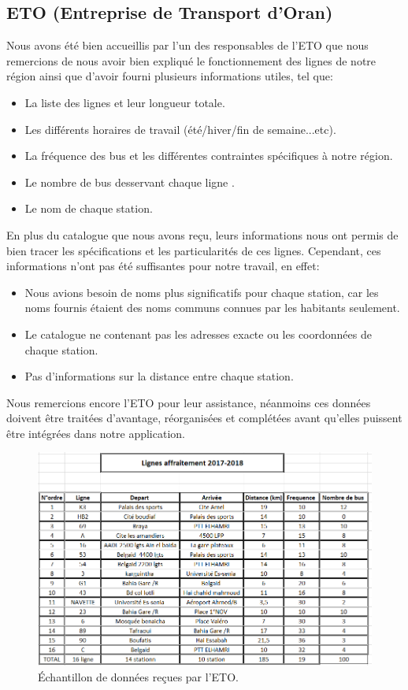 \subsection{ETO (Entreprise de Transport d'Oran)}

Nous avons été bien accueillis par l'un des responsables de l'ETO que nous remercions de nous avoir bien expliqué le fonctionnement des lignes de notre région ainsi que d'avoir fourni plusieurs informations utiles, tel que:
\begin{itemize}
	\item La liste des lignes et leur longueur totale.
	\item Les différents horaires de travail (été/hiver/fin de semaine...etc).
	\item La fréquence des bus et les différentes contraintes spécifiques à notre région.
	\item Le nombre de bus desservant chaque ligne .
	\item Le nom de chaque station.
\end{itemize}

En plus du catalogue que nous avons reçu, leurs informations nous ont permis de bien tracer les spécifications et les particularités de ces lignes.
Cependant, ces informations n'ont pas été suffisantes pour notre travail, en effet:
	\begin{itemize}
	\item Nous avions besoin de noms plus significatifs pour chaque station, car les noms fournis étaient des noms communs connues par les habitants seulement.
	\item Le catalogue ne contenant pas les adresses exacte ou les coordonnées de chaque station.
	\item Pas d'informations sur la distance entre chaque station.
	\end{itemize}
	
Nous remercions encore l'ETO pour leur assistance, néanmoins ces données doivent être traitées d'avantage, réorganisées et complétées avant qu'elles puissent être intégrées dans notre application.

\begin{figure}
	\center
	\includegraphics[scale=0.7]{img/LignesETO.png}
	\caption{Échantillon de données reçues par l'ETO.}
\end{figure}

